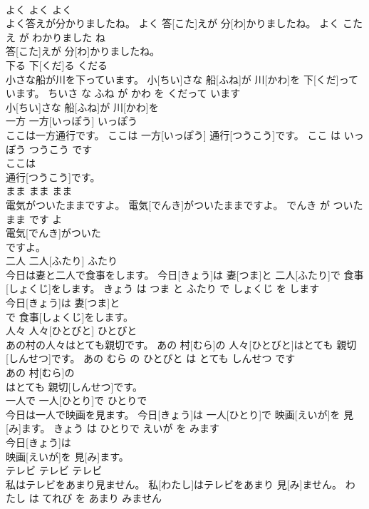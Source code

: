 \documentclass[8pt]{extreport}
\begin{document}
\begin{CJK}{UTF8}{min}
\\	よく	よく	よく	
\\	よく答えが分かりましたね。	よく 答[こた]えが 分[わ]かりましたね。	よく こたえ が わかりました ね	
\\	答[こた]えが 分[わ]かりましたね。			
\\	下る	下[くだ]る	くだる	
\\	小さな船が川を下っています。	小[ちい]さな 船[ふね]が 川[かわ]を 下[くだ]っています。	ちいさ な ふね が かわ を くだって います	
\\	小[ちい]さな 船[ふね]が 川[かわ]を
\\	一方	一方[いっぽう]	いっぽう	
\\	ここは一方通行です。	ここは 一方[いっぽう] 通行[つうこう]です。	ここ は いっぽう つうこう です	
\\	ここは
\\	通行[つうこう]です。			
\\	まま	まま	まま	
\\	電気がついたままですよ。	電気[でんき]がついたままですよ。	でんき が ついた まま です よ	
\\	電気[でんき]がついた
\\	ですよ。			
\\	二人	二人[ふたり]	ふたり	
\\	今日は妻と二人で食事をします。	今日[きょう]は 妻[つま]と 二人[ふたり]で 食事[しょくじ]をします。	きょう は つま と ふたり で しょくじ を します	
\\	今日[きょう]は 妻[つま]と
\\	で 食事[しょくじ]をします。			
\\	人々	人々[ひとびと]	ひとびと	
\\	あの村の人々はとても親切です。	あの 村[むら]の 人々[ひとびと]はとても 親切[しんせつ]です。	あの むら の ひとびと は とても しんせつ です	
\\	あの 村[むら]の
\\	はとても 親切[しんせつ]です。			
\\	一人で	一人[ひとり]で	ひとりで	
\\	今日は一人で映画を見ます。	今日[きょう]は 一人[ひとり]で 映画[えいが]を 見[み]ます。	きょう は ひとりで えいが を みます	
\\	今日[きょう]は
\\	映画[えいが]を 見[み]ます。			
\\	テレビ	テレビ	テレビ	
\\	私はテレビをあまり見ません。	私[わたし]はテレビをあまり 見[み]ません。	わたし は てれび を あまり みません	

\end{CJK}
\end{document}
